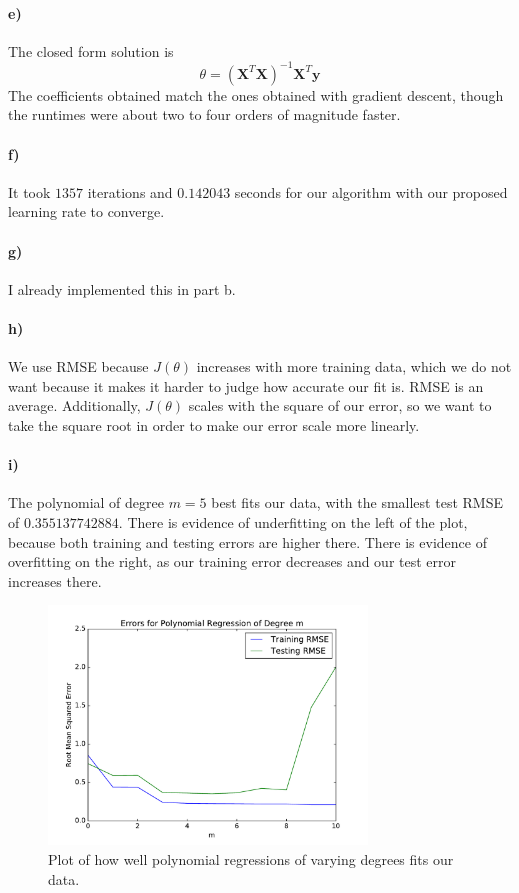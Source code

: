 \documentclass[12pt]{article}
\begin{document}
\paragraph{e)}

The closed form solution is
\[\theta=\left(\mathbf{X}^T\mathbf{X}\right)^{-1}\mathbf{X}^T\mathbf{y}\]
The coefficients obtained match the ones obtained with gradient descent, though the runtimes were about two to four orders of magnitude
faster.

\paragraph{f)}

It took \(1357\) iterations and \(0.142043\) seconds for our algorithm with our proposed learning rate to converge.

\paragraph{g)}

I already implemented this in part b.

\paragraph{h)}

We use RMSE because \(J(\theta)\) increases with more training data, which we do not want because it makes it harder to judge how accurate our
fit is. RMSE is an average. Additionally, \(J(\theta)\) scales with the square of our error, so we want to take the square root in order to make
our error scale more linearly.

\paragraph{i)}

The polynomial of degree \(m=5\) best fits our data, with the smallest test RMSE of \(0.355137742884\). There is evidence of underfitting
on the left of the plot, because both training and testing errors are higher there. There is evidence of overfitting on the right, as our
training error decreases and our test error increases there.

\begin{figure}[H]
        \begin{center}
                \includegraphics[height=2.5in]{polynomialRegression}
                \caption{Plot of how well polynomial regressions of varying degrees fits our data.}
        \end{center}
\end{figure}
\end{document}
